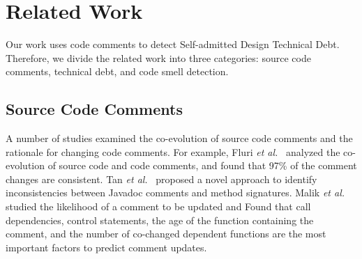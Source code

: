 \documentclass[conference]{IEEEtran}
\newcommand{\emad}[1]{\textcolor{red}{{\it [Emad: #1]}}}
\newcommand{\conclusionbox}[1]{%
	\vspace{2mm}
	\framebox[0.45\textwidth][c]{%
		\parbox[b]{0.42\textwidth}{%
			{\it #1}
		}
	}
	\vspace{2mm}
}
\newcommand{\SADTD}{Self-admitted Design Technical Debt\xspace}
\begin{document}
%
%

\section{Related Work}
\label{sec:related_work}

Our work uses code comments to detect \SADTD. Therefore, we divide the related work into three categories: source code comments, technical debt, and code smell detection.

\subsection{Source Code Comments}

A number of studies examined the co-evolution of source code comments and the rationale for changing code comments. For example, Fluri \textit{et al.}~\cite{Fluri2007WCRE} analyzed the co-evolution of source code and code comments, and found that 97\% of the comment changes are consistent. Tan \textit{et al.}~\cite{Tan2012ICST} proposed a novel approach to identify inconsistencies between Javadoc comments and method signatures. Malik \textit{et al.} \cite{Malik2008ICSM} studied the likelihood of a comment to be updated and Found that   call dependencies, control statements, the age of the function containing the comment, and the number of co-changed dependent functions are the most important factors to predict comment updates.
\end{document}
